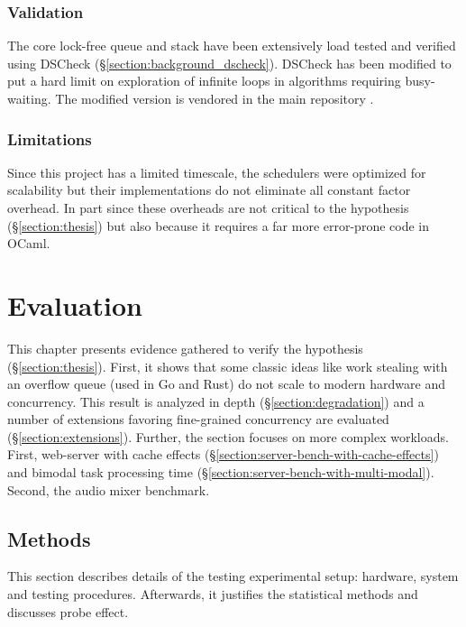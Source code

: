 \documentclass[12pt,a4paper,twoside]{report}
\begin{document}
\subsection{Validation}

The core lock-free queue and stack have been extensively load tested and verified using DSCheck (\S\ref{section:background_dscheck}). DSCheck has been modified to put a hard limit on exploration of infinite loops in algorithms requiring busy-waiting. The modified version is vendored in the main repository \cite{bartoszm90:online}.

\subsection{Limitations}

Since this project has a limited timescale, the schedulers were optimized for scalability but their implementations do not eliminate all constant factor overhead. In part since these overheads are not critical to the hypothesis (\S\ref{section:thesis}) but also because it requires a far more error-prone code in OCaml. 



\chapter{Evaluation}
\label{chapter:evaluation}

This chapter presents evidence gathered to verify the hypothesis (\S\ref{section:thesis}). First, it shows that some classic ideas like work stealing with an overflow queue (used in Go and Rust) do not scale to modern hardware and concurrency. This result is analyzed in depth (\S\ref{section:degradation}) and a number of extensions favoring fine-grained concurrency are evaluated (\S\ref{section:extensions}). Further, the section focuses on more complex workloads. First, web-server with cache effects (\S\ref{section:server-bench-with-cache-effects}) 
and bimodal task processing time (\S\ref{section:server-bench-with-multi-modal}). Second, the audio mixer benchmark. 


\section{Methods}

This section describes details of the testing experimental setup: hardware, system and testing procedures. Afterwards, it justifies the statistical methods and discusses probe effect.
\end{document}
